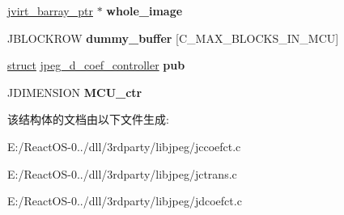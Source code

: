 \begin{DoxyCompactItemize}
\item 
\mbox{\label{structmy__coef__controller_a7e6db8186140ced6ed561b2860c84819}} 
\hyperlink{structjvirt__barray__control}{jvirt\+\_\+barray\+\_\+ptr} $\ast$ {\bfseries whole\+\_\+image}
\item 
\mbox{\label{structmy__coef__controller_a5cffa07081b1c4361d9dfe48373c8240}} 
J\+B\+L\+O\+C\+K\+R\+OW {\bfseries dummy\+\_\+buffer} \mbox{[}C\+\_\+\+M\+A\+X\+\_\+\+B\+L\+O\+C\+K\+S\+\_\+\+I\+N\+\_\+\+M\+CU\mbox{]}
\item 
\mbox{\label{structmy__coef__controller_a09524018020a2d7edbbcd92400f0919a}} 
\hyperlink{interfacestruct}{struct} \hyperlink{structjpeg__d__coef__controller}{jpeg\+\_\+d\+\_\+coef\+\_\+controller} {\bfseries pub}
\item 
\mbox{\label{structmy__coef__controller_a17ccbcfc9a173194725050412855d7cf}} 
J\+D\+I\+M\+E\+N\+S\+I\+ON {\bfseries M\+C\+U\+\_\+ctr}
\end{DoxyCompactItemize}


该结构体的文档由以下文件生成\+:\begin{DoxyCompactItemize}
\item 
E\+:/\+React\+O\+S-\/0../dll/3rdparty/libjpeg/jccoefct.\+c\item 
E\+:/\+React\+O\+S-\/0../dll/3rdparty/libjpeg/jctrans.\+c\item 
E\+:/\+React\+O\+S-\/0../dll/3rdparty/libjpeg/jdcoefct.\+c\end{DoxyCompactItemize}
